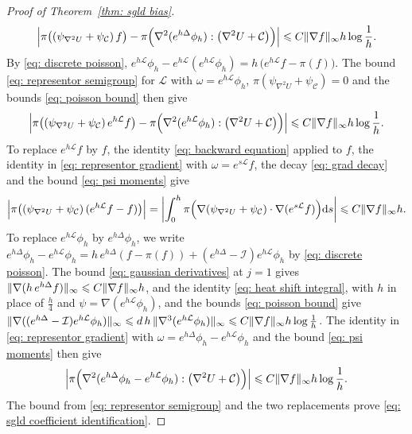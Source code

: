 \begin{proof}[Proof of Theorem~\ref{thm: sgld bias}]
    \begin{equation}
        \Bigl| \pi\bigl( ( \psi_{\nabla^2 U} + \psi_{\mathcal C} )\, f \bigr) - \pi\Bigl( \nabla^2 ( e^{h\Delta} \phi_h ) : \bigl( \nabla^2 U + \mathcal C \bigr) \Bigr) \Bigr| \leqslant C \lVert \nabla f \rVert_\infty h \log\frac1h .
        \label{eq: sgld coefficient identification}
    \end{equation}
    By \eqref{eq: discrete poisson}, $e^{h\mathcal L} \phi_h - e^{h\mathcal L} ( e^{h\mathcal L} \phi_h ) = h\, \bigl( e^{h\mathcal L} f - \pi(f) \bigr)$. The bound \eqref{eq: representor semigroup} for $\mathcal L$ with $\omega = e^{h\mathcal L} \phi_h$, $\pi( \psi_{\nabla^2 U} + \psi_{\mathcal C} ) = 0$ and the bounds \eqref{eq: poisson bound} then give
    \begin{equation*}
        \Bigl| \pi\bigl( ( \psi_{\nabla^2 U} + \psi_{\mathcal C} )\, e^{h\mathcal L} f \bigr) - \pi\Bigl( \nabla^2 ( e^{h\mathcal L} \phi_h ) : \bigl( \nabla^2 U + \mathcal C \bigr) \Bigr) \Bigr| \leqslant C \lVert \nabla f \rVert_\infty h \log\frac1h .
    \end{equation*}
    To replace $e^{h\mathcal L} f$ by $f$, the identity \eqref{eq: backward equation} applied to $f$, the identity in \eqref{eq: representor gradient} with $\omega = e^{s\mathcal L} f$, the decay \eqref{eq: grad decay} and the bound \eqref{eq: psi moments} give
    \begin{equation*}
        \Bigl| \pi\bigl( ( \psi_{\nabla^2 U} + \psi_{\mathcal C} )\, ( e^{h\mathcal L} f - f ) \bigr) \Bigr| = \biggl| \int_0^h \pi\Bigl( \nabla ( \psi_{\nabla^2 U} + \psi_{\mathcal C} ) \cdot \nabla ( e^{s\mathcal L} f ) \Bigr) \mathrm{d} s \biggr| \leqslant C \lVert \nabla f \rVert_\infty h .
    \end{equation*}
    To replace $e^{h\mathcal L} \phi_h$ by $e^{h\Delta} \phi_h$, we write $e^{h\Delta} \phi_h - e^{h\mathcal L} \phi_h = h\, e^{h\Delta} ( f - \pi(f) ) + ( e^{h\Delta} - \mathcal I ) e^{h\mathcal L} \phi_h$ by \eqref{eq: discrete poisson}. The bound \eqref{eq: gaussian derivatives} at $j = 1$ gives $\lVert \nabla ( h\, e^{h\Delta} f ) \rVert_\infty \leqslant C \lVert \nabla f \rVert_\infty h$, and the identity \eqref{eq: heat shift integral}, with $h$ in place of $\frac h4$ and $\psi = \nabla ( e^{h\mathcal L} \phi_h )$, and the bounds \eqref{eq: poisson bound} give $\lVert \nabla ( ( e^{h\Delta} - \mathcal I ) e^{h\mathcal L} \phi_h ) \rVert_\infty \leqslant d\, h\, \lVert \nabla^3 ( e^{h\mathcal L} \phi_h ) \rVert_\infty \leqslant C \lVert \nabla f \rVert_\infty h \log\frac1h$. The identity in \eqref{eq: representor gradient} with $\omega = e^{h\Delta} \phi_h - e^{h\mathcal L} \phi_h$ and the bound \eqref{eq: psi moments} then give
    \begin{equation*}
        \Bigl| \pi\Bigl( \nabla^2 ( e^{h\Delta} \phi_h - e^{h\mathcal L} \phi_h ) : \bigl( \nabla^2 U + \mathcal C \bigr) \Bigr) \Bigr| \leqslant C \lVert \nabla f \rVert_\infty h \log\frac1h .
    \end{equation*}
    The bound from \eqref{eq: representor semigroup} and the two replacements prove \eqref{eq: sgld coefficient identification}.


\end{proof}
